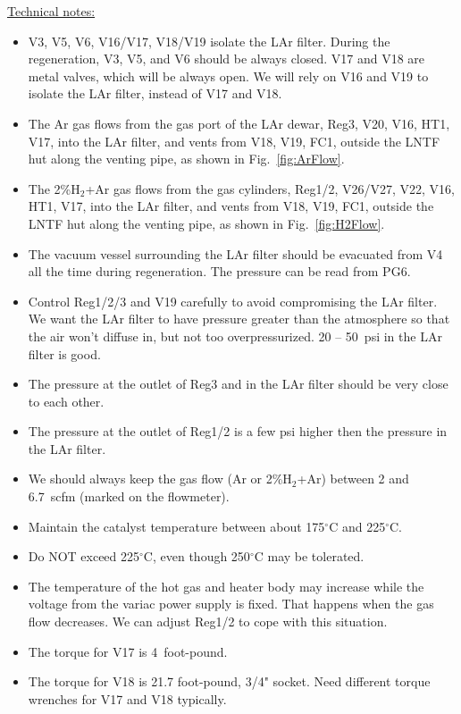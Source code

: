 \documentclass[letterpaper,11pt]{article}
\newcommand{\Hydro}     {H$_2$}
\newcommand{\dC}        {$^\circ$C}
\begin{document}
\underline{Technical notes:}
\begin{itemize}
\setlength\itemsep{-0.2em}
\item V3, V5, V6, V16/V17, V18/V19 isolate the LAr filter.  
During the regeneration, V3, V5, and V6 should be always closed.  
V17 and V18 are metal valves, which will be always open.
We will rely on V16 and V19 to isolate the LAr filter, instead of V17 and V18.
\item The Ar gas flows from the gas port of the LAr dewar, Reg3, V20, V16, HT1, V17, into the LAr filter, 
and vents from V18, V19, FC1, outside the LNTF hut along the venting pipe, as shown in 
Fig.~\ref{fig:ArFlow}.
\item The 2\%{\Hydro}+Ar gas flows from the gas cylinders, Reg1/2, V26/V27, V22, V16, HT1, V17, 
into the LAr filter, 
and vents from V18, V19, FC1, outside the LNTF hut along the venting pipe, 
as shown in Fig.~\ref{fig:H2Flow}.
\item The vacuum vessel surrounding the LAr filter should be evacuated from V4 all the time during regeneration.  
The pressure can be read from PG6.
\item Control Reg1/2/3 and V19 carefully to avoid compromising the LAr filter.  We want the LAr filter to have pressure 
greater than the atmosphere so that the air won't diffuse in, but not too overpressurized.  
20 -- 50~psi in the LAr filter is good.
\item The pressure at the outlet of Reg3 and in the LAr filter should be very close to each other.
\item The pressure at the outlet of Reg1/2 is a few psi higher then the pressure in the LAr filter.
\item We should always keep the gas flow (Ar or 2\%{\Hydro}+Ar) between 2 and 6.7~scfm (marked on the flowmeter).
\item Maintain the catalyst temperature between about 175{\dC} and 225{\dC}.
\item Do NOT exceed 225{\dC}, even though 250{\dC} may be tolerated.
\item The temperature of the hot gas and heater body may increase while the voltage from the variac power supply
is fixed.  That happens when the gas flow decreases.  We can adjust Reg1/2 to cope with this situation.
\item The torque for V17 is 4~foot-pound.
\item The torque for V18 is 21.7 foot-pound, 3/4" socket.  Need different torque wrenches for V17 and V18 typically.
\end{itemize}
\end{document}
